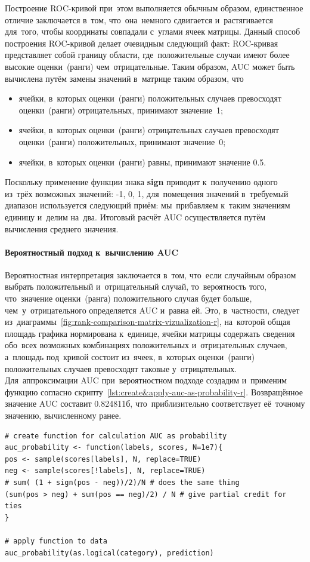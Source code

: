 \documentclass[]{scrreprt}
\begin{document}
Построение ROC-кривой при~этом выполняется обычным образом, единственное отличие заключается в~том, что~она~немного сдвигается и~растягивается для~того, чтобы координаты совпадали с~углами ячеек матрицы. Данный способ построения ROC-кривой делает очевидным следующий факт: ROC-кривая представляет собой границу области, где~положительные случаи имеют более высокие оценки~(ранги) чем~отрицательные. Таким образом, AUC может быть вычислена путём замены значений в~матрице таким образом, что
\begin{itemize}
	\item ячейки, в~которых оценки~(ранги) положительных случаев превосходят оценки~(ранги) отрицательных, принимают значение~1;
	\item ячейки, в~которых оценки~(ранги) отрицательных случаев превосходят оценки~(ранги) положительных, принимают значение~0;
	\item ячейки, в~которых оценки~(ранги) равны, принимают значение 0.5.
\end{itemize}
Поскольку применение функции знака \textbf{sign} приводит к~получению одного из~трёх возможных значений: -1, 0, 1, для~помещения значений в~требуемый диапазон используется следующий приём: мы~прибавляем к~таким значениям единицу и~делим на~два. Итоговый расчёт AUC осуществляется путём вычисления среднего значения.

\paragraph{Вероятностный подход к~вычислению AUC}
Вероятностная интерпретация заключается в~том, что~если случайным образом выбрать положительный и~отрицательный случай, то~вероятность того, что~значение оценки~(ранга) положительного случая будет больше, чем~у~отрицательного определяется AUC и~равна ей. Это, в~частности, следует из~диаграммы~\ref{fig:rank-comparison-matrix-vizualization-r}, на~которой общая площадь графика нормирована к~единице, ячейки матрицы содержать сведения обо~всех возможных комбинациях положительных и~отрицательных случаев, а~площадь под~кривой состоит из~ячеек, в~которых оценки~(ранги) положительных случаев превосходят таковые у~отрицательных. Для~аппроксимации AUC при~вероятностном подходе создадим и~применим функцию согласно скрипту~\ref{lst:create&apply-auc-as-probability-r}. Возвращённое значение AUC составит 0.824811б, что~приблизительно соответствует её~точному значению, вычисленному ранее. 
%
\begin{lstlisting}[float, caption = Создание и~применение функции для~вычисления AUC как вероятности, firstnumber=1, label= lst:create&apply-auc-as-probability-r]
# create function for calculation AUC as probability
auc_probability <- function(labels, scores, N=1e7){
pos <- sample(scores[labels], N, replace=TRUE)
neg <- sample(scores[!labels], N, replace=TRUE)
# sum( (1 + sign(pos - neg))/2)/N # does the same thing
(sum(pos > neg) + sum(pos == neg)/2) / N # give partial credit for ties
}

# apply function to data
auc_probability(as.logical(category), prediction)
\end{lstlisting}
%
\end{document}

